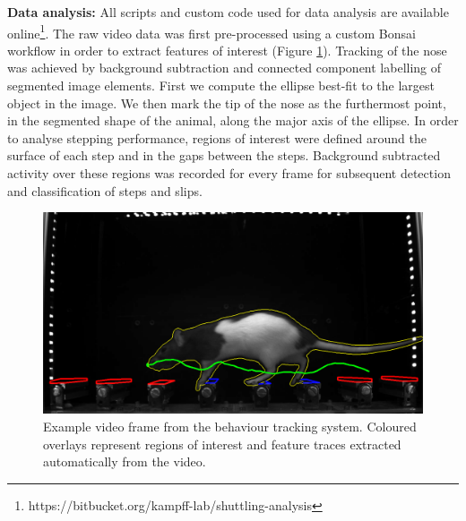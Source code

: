 \textbf{Data analysis:} All scripts and custom code used for data analysis are available online\footnote{https://bitbucket.org/kampff-lab/shuttling-analysis}. The raw video data was first pre-processed using a custom Bonsai workflow in order to extract features of interest (Figure \ref{fig:videography}). Tracking of the nose was achieved by background subtraction and connected component labelling of segmented image elements. First we compute the ellipse best-fit to the largest object in the image. We then mark the tip of the nose as the furthermost point, in the segmented shape of the animal, along the major axis of the ellipse. In order to analyse stepping performance, regions of interest were defined around the surface of each step and in the gaps between the steps. Background subtracted activity over these regions was recorded for every frame for subsequent detection and classification of steps and slips.

\begin{figure}
\begin{center}
\includegraphics[width=0.75\columnwidth]{chapters/figuresChBehaviour/videography}
\end{center}
\vspace{-5mm}
\caption{Example video frame from the behaviour tracking system. Coloured overlays represent regions of interest and feature traces extracted automatically from the video.}
\label{fig:videography}
\end{figure}

